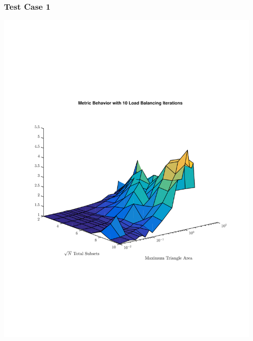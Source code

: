 \documentclass[]{beamer}
\begin{document}
\begin{frame}[t]\frametitle{Test Case 1}
\centering
\includegraphics[scale=0.47, trim = 0cm 8cm 0cm 7cm]{figures/OppIter.pdf}
\end{frame}
\end{document}
